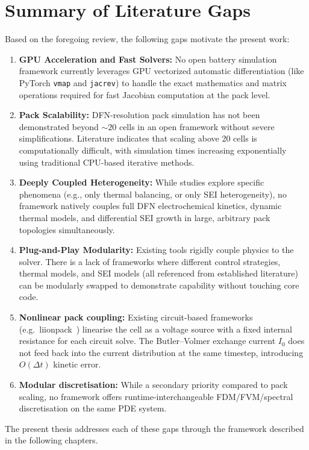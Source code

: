 \section{Summary of Literature Gaps}
\label{sec:lit_summary}

Based on the foregoing review, the following gaps motivate the present work:

\begin{enumerate}
  \item \textbf{GPU Acceleration and Fast Solvers:} No open battery simulation framework currently leverages GPU vectorized automatic differentiation (like PyTorch \texttt{vmap} and \texttt{jacrev}) to handle the exact mathematics and matrix operations required for fast Jacobian computation at the pack level.
  \item \textbf{Pack Scalability:} DFN-resolution pack simulation has not been demonstrated beyond $\sim 20$ cells in an open framework without severe simplifications. Literature indicates that scaling above 20 cells is computationally difficult, with simulation times increasing exponentially using traditional CPU-based iterative methods.
  \item \textbf{Deeply Coupled Heterogeneity:} While studies explore specific phenomena (e.g., only thermal balancing, or only SEI heterogeneity), no framework natively couples full DFN electrochemical kinetics, dynamic thermal models, and differential SEI growth in large, arbitrary pack topologies simultaneously.
  \item \textbf{Plug-and-Play Modularity:} Existing tools rigidly couple physics to the solver. There is a lack of frameworks where different control strategies, thermal models, and SEI models (all referenced from established literature) can be modularly swapped to demonstrate capability without touching core code.
  \item \textbf{Nonlinear pack coupling:} Existing circuit-based frameworks (e.g.\ liionpack~\cite{Tranter2022}) linearise the cell as a voltage source with a fixed internal resistance for each circuit solve. The Butler--Volmer exchange current $I_0$ does not feed back into the current distribution at the same timestep, introducing $O(\Delta t)$ kinetic error.
  \item \textbf{Modular discretisation:} While a secondary priority compared to pack scaling, no framework offers runtime-interchangeable FDM/FVM/spectral discretisation on the same PDE system.
\end{enumerate}

The present thesis addresses each of these gaps through the \VIBE{} framework described in the following chapters.
